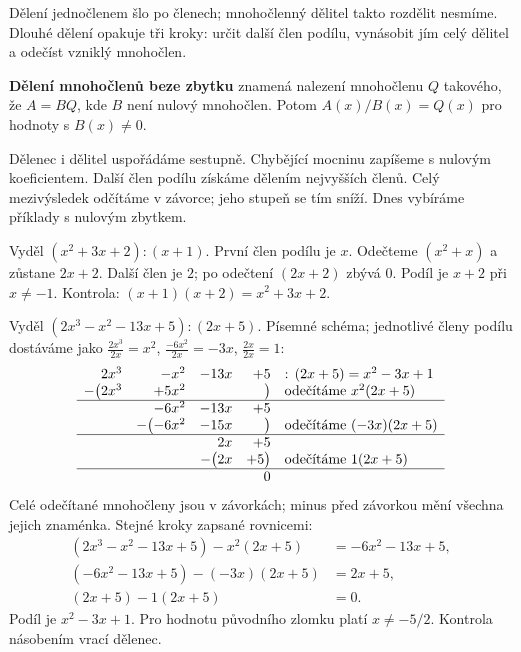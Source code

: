 \documentclass[11pt,a4paper]{article}
\begin{document}

Dělení jednočlenem šlo po členech; mnohočlenný dělitel takto rozdělit nesmíme. Dlouhé dělení opakuje tři kroky: určit další člen podílu, vynásobit jím celý dělitel a odečíst vzniklý mnohočlen.

\begin{definiceBox}[title={Definice},breakable=false]
\textbf{Dělení mnohočlenů beze zbytku} znamená nalezení mnohočlenu $Q$ takového, že $A=BQ$, kde $B$ není nulový mnohočlen. Potom $A(x)/B(x)=Q(x)$ pro hodnoty s $B(x)\ne0$.
\end{definiceBox}


Dělenec i dělitel uspořádáme sestupně. Chybějící mocninu zapíšeme s nulovým koeficientem. Další člen podílu získáme dělením nejvyšších členů. Celý mezivýsledek odčítáme v závorce; jeho stupeň se tím sníží. Dnes vybíráme příklady s nulovým zbytkem.


\begin{prikladReseniBox}[title={Příklad 1},breakable=false]
Vyděl $(x^2+3x+2):(x+1)$.
\tcblower
První člen podílu je $x$. Odečteme $(x^2+x)$ a zůstane $2x+2$. Další člen je $2$; po odečtení $(2x+2)$ zbývá $0$. Podíl je $x+2$ při $x\ne-1$. Kontrola: $(x+1)(x+2)=x^2+3x+2$.
\end{prikladReseniBox}


\begin{prikladReseniBox}[title={Příklad 2},breakable=false]
Vyděl $(2x^3-x^2-13x+5):(2x+5)$.
\tcblower
Písemné schéma; jednotlivé členy podílu dostáváme jako
$\frac{2x^3}{2x}=x^2$, $\frac{-6x^2}{2x}=-3x$, $\frac{2x}{2x}=1$:
\[
\begin{array}{r r r r l}
 2x^3&-x^2&-13x&+5&:\,(2x+5)=x^2-3x+1\\
 -\bigl(2x^3&+5x^2&&\bigr)&\text{odečítáme }x^2(2x+5)\\ \hline
 &-6x^2&-13x&+5&\\
 &-\bigl(-6x^2&-15x&\bigr)&\text{odečítáme }(-3x)(2x+5)\\ \hline
 &&2x&+5&\\
 &&-\bigl(2x&+5\bigr)&\text{odečítáme }1(2x+5)\\ \hline
 &&&0&
\end{array}
\]
Celé odečítané mnohočleny jsou v závorkách; minus před závorkou mění všechna jejich znaménka. Stejné kroky zapsané rovnicemi:
\begin{align*}
(2x^3-x^2-13x+5)-x^2(2x+5)&=-6x^2-13x+5,\\
(-6x^2-13x+5)-(-3x)(2x+5)&=2x+5,\\
(2x+5)-1(2x+5)&=0.
\end{align*}
Podíl je $x^2-3x+1$. Pro hodnotu původního zlomku platí $x\ne-5/2$. Kontrola násobením vrací dělenec.
\end{prikladReseniBox}
\end{document}
